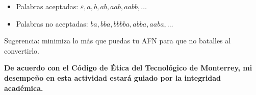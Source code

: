 \documentclass[8pt, onside]{article}
\begin{document}
\begin{itemize}
    \item Palabras aceptadas: $\varepsilon, a, b, ab, aab, aabb, \dots$
    \item Palabras no aceptadas: $ba, bba, bbbba, abba, aaba, \dots$
\end{itemize}

Sugerencia: minimiza lo más que puedas tu AFN para que no batalles al convertirlo.

\vfill

\textbf{De acuerdo con el Código de Ética del Tecnológico de Monterrey, mi desempeño en esta actividad estará guiado por la integridad académica.}
\end{document}
